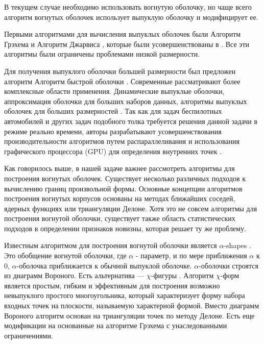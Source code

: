 В текущем случае необходимо использовать вогнутую оболочку, но чаще всего алгоритм вогнутых оболочек использует выпуклую оболочку и модифицирует ее.

Первыми алгоритмами для вычисления выпуклых оболочек были Алгоритм Грэхема \cite{grahamEfficientAlgorithDetermining1972} и Алгоритм Джарвиса \cite{jarvisIdentificationConvexHull1973}, которые были усовершенствованы в \cite{chanOptimalOutputsensitiveConvex1996}. Все эти алгоритмы были ограничены проблемами низкой размерности. 

Для получения выпуклого оболочки большей размерности был предложен алгоритм Алгоритм быстрой оболочки \cite{clarksonApplicationsRandomSampling1988}. Современные рассматривают более комплексные области применения. Динамические выпуклые оболочки, аппроксимация оболочки для больших наборов данных, алгоритмы выпуклых оболочек для больших размерностей \cite{brodalDynamicPlanarConvex2002,khosravaniSimpleAlgorithmConvex2013,zhongFindingConvexHull2014}. Так как для задач беспилотных автомобилей и других задач подобного толка требуется решения данной задачи в режиме реально времени, авторы разрабатывают усовершенствования производительности алгоритмов путем распараллеливания и использования графического процессора (GPU) для определения внутренних точек \cite{zhongFindingConvexHull2014,cintraSpeculativeParallelizationRandomized2004,cintraSpeculativeParallelizationRandomized2004,tangSMI2012Full2012,tzengFindingConvexHulls2012}.

Как говорилось выше, в нашей задаче важнее рассмотреть алгоритмы для построения вогнутых оболочек. Существует несколько различных подходов к вычислению границ произвольной формы. Основные концепции алгоритмов построения вогнутых корпусов основаны на методах ближайших соседей, ядерных функциях или триангуляции Делоне. Хотя это не совсем алгоритмы для построения вогнутой оболочки, существует также область статистических подходов в определении признаков новизны, которая решает ту же проблему. 

Известным алгоритмом для построения вогнутой оболочки является $\alpha$-shapes \cite{edelsbrunnerShapeSetPoints1983,edelsbrunnerThreedimensionalAlphaShapes1992}. Это обобщение вогнутой оболочки, где $\alpha$ - параметр, и по мере приближения $\alpha$ к 0, $\alpha$-оболочка приближается к обычной выпуклой оболочке. $\alpha$-оболочки строятся из диаграмм Вороного. Есть альтернатива --- $\chi$-фигуры \cite{duckhamEfficientGenerationSimple2008}. Алгоритм $\chi$-форм является простым, гибким и эффективным для построения возможно невыпуклого простого многоугольника, который характеризует форму набора входных точек на плоскости, называемую характерной формой. Вместо диаграмм Вороного алгоритм основан на триангуляции точек по методу Делоне. Есть еще модификации на основанные на алгоритме Грэхема \cite{xuConcaveHullAlgorithm2010} с унаследованными ограничениями. 

